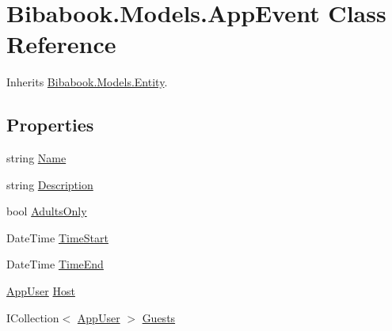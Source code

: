 \hypertarget{class_bibabook_1_1_models_1_1_app_event}{}\section{Bibabook.\+Models.\+App\+Event Class Reference}
\label{class_bibabook_1_1_models_1_1_app_event}


Inherits \hyperlink{class_bibabook_1_1_models_1_1_entity}{Bibabook.\+Models.\+Entity}.

\subsection*{Properties}
\begin{DoxyCompactItemize}
\item 
string \hyperlink{class_bibabook_1_1_models_1_1_app_event_ae0581126283337c793d4397afd74dc05}{Name}
\item 
string \hyperlink{class_bibabook_1_1_models_1_1_app_event_a708f5e987188de2194b658e65f0eccf8}{Description}
\item 
bool \hyperlink{class_bibabook_1_1_models_1_1_app_event_a3790cdd6ba4f1cb6af661aa209741304}{Adults\+Only}
\item 
Date\+Time \hyperlink{class_bibabook_1_1_models_1_1_app_event_aaaa7d9529bde8734f6aaece0f8d6d0a4}{Time\+Start}
\item 
Date\+Time \hyperlink{class_bibabook_1_1_models_1_1_app_event_a121f344bd075a3a6c50b18d85743e73a}{Time\+End}
\item 
\hyperlink{class_bibabook_1_1_models_1_1_app_user}{App\+User} \hyperlink{class_bibabook_1_1_models_1_1_app_event_a6b4d0b76fc1dae3eb15e58fe77de7a66}{Host}
\item 
I\+Collection$<$ \hyperlink{class_bibabook_1_1_models_1_1_app_user}{App\+User} $>$ \hyperlink{class_bibabook_1_1_models_1_1_app_event_a400e6e7d179a7669b0f566e9f47896f2}{Guests}

\end{DoxyCompactItemize}
